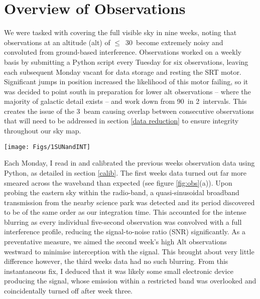\documentclass[11pt]{article} %
\begin{document}
\section{Overview of Observations} \label{obs}

We were tasked with covering the full visible sky in nine weeks, noting that observations at an altitude (alt) of $\leq$~30\degree~become extremely noisy and convoluted from ground-based interference. Observations worked on a weekly basis by submitting a Python script every Tuesday for six observations, leaving each subsequent Monday vacant for data storage and resting the SRT motor. Significant jumps in position increased the likelihood of this motor failing, so it was decided to point south in preparation for lower alt observations -- where the majority of galactic detail exists -- and work down from 90\degree~in 2\degree~intervals. This creates the issue of the 3\degree~beam causing overlap between consecutive observations that will need to be addressed in section \ref{data reduction} to ensure integrity throughout our sky map.

%

\begin{figure*}[t!]
\centering
\texttt{[image: Figs/1SUNandINT]}
\caption{Calibrated Observation files. a) Smearing effect of interference source b) Saturation across full waveband from clipping the Sun.}
\label{fig:obs}
\end{figure*}

%

Each Monday, I read in and calibrated the previous week\textquotesingle s observation data using Python, as detailed in section \ref{calib}. The first week\textquotesingle s data turned out far more smeared across the waveband than expected (see figure \ref{fig:obs}(a)). Upon probing the eastern sky within the radio-band, a quasi-sinusoidal broadband transmission from the nearby science park was detected and its period discovered to be of the same order as our integration time. This accounted for the intense blurring as every individual five-second observation was convolved with a full interference profile, reducing the signal-to-noise ratio (SNR) significantly. As a preventative measure, we aimed the second week’s high Alt observations westward to minimise interception with the signal. This brought about very little difference however, the third week\textquotesingle s data had no such blurring. From this instantaneous fix, I deduced that it was likely some small electronic device producing the signal, whose emission within a restricted band was overlooked and coincidentally turned off after week three.
\end{document}
